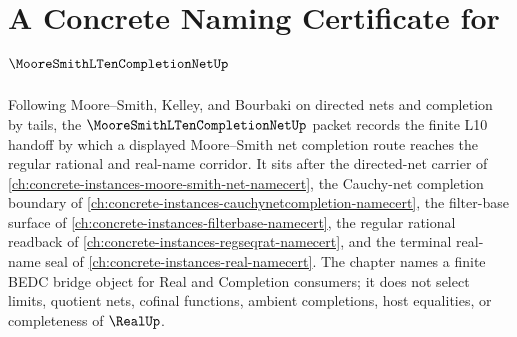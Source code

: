\chapter{A Concrete Naming Certificate for $\MooreSmithLTenCompletionNetUp$}
\label{ch:concrete-instances-moore-smith-l10-completion-net-namecert}

Following Moore--Smith, Kelley, and Bourbaki on directed nets and completion by tails, the $\MooreSmithLTenCompletionNetUp$ packet records the finite L10 handoff by which a displayed Moore--Smith net completion route reaches the regular rational and real-name corridor. It sits after the directed-net carrier of \autoref{ch:concrete-instances-moore-smith-net-namecert}, the Cauchy-net completion boundary of \autoref{ch:concrete-instances-cauchynetcompletion-namecert}, the filter-base surface of \autoref{ch:concrete-instances-filterbase-namecert}, the regular rational readback of \autoref{ch:concrete-instances-regseqrat-namecert}, and the terminal real-name seal of \autoref{ch:concrete-instances-real-namecert}. The chapter names a finite BEDC bridge object for Real and Completion consumers; it does not select limits, quotient nets, cofinal functions, ambient completions, host equalities, or completeness of $\RealUp$.


